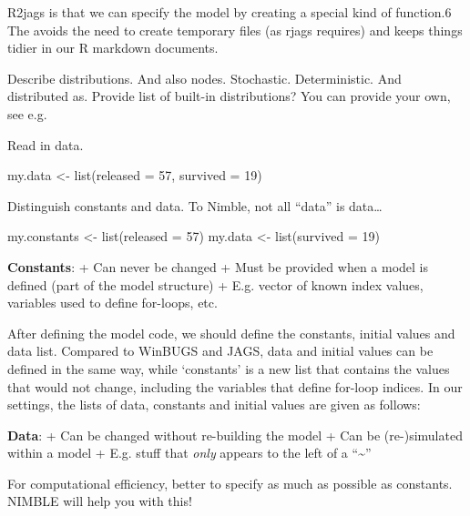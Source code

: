 \documentclass[
  12pt,
]{krantz}
\newenvironment{Shaded}{\begin{snugshade}}{\end{snugshade}}
\newcommand{\AttributeTok}[1]{\textcolor[rgb]{0.77,0.63,0.00}{#1}}
\newcommand{\DecValTok}[1]{\textcolor[rgb]{0.00,0.00,0.81}{#1}}
\newcommand{\FunctionTok}[1]{\textcolor[rgb]{0.00,0.00,0.00}{#1}}
\newcommand{\NormalTok}[1]{#1}
\newcommand{\OtherTok}[1]{\textcolor[rgb]{0.56,0.35,0.01}{#1}}
\begin{document}
R2jags is that we can specify the model by creating a special kind of function.6 The avoids the need to create temporary files (as rjags requires) and keeps things tidier in our R markdown documents.

Describe distributions. And also nodes. Stochastic. Deterministic. And distributed as. Provide list of built-in distributions? You can provide your own, see e.g.~

Read in data.

\begin{Shaded}
\begin{Highlighting}[]
\NormalTok{my.data }\OtherTok{\textless{}{-}} \FunctionTok{list}\NormalTok{(}\AttributeTok{released =} \DecValTok{57}\NormalTok{, }\AttributeTok{survived =} \DecValTok{19}\NormalTok{)}
\end{Highlighting}
\end{Shaded}

Distinguish constants and data. To Nimble, not all ``data'' is data\ldots{}

\begin{Shaded}
\begin{Highlighting}[]
\NormalTok{my.constants }\OtherTok{\textless{}{-}} \FunctionTok{list}\NormalTok{(}\AttributeTok{released =} \DecValTok{57}\NormalTok{)}
\NormalTok{my.data }\OtherTok{\textless{}{-}} \FunctionTok{list}\NormalTok{(}\AttributeTok{survived =} \DecValTok{19}\NormalTok{)}
\end{Highlighting}
\end{Shaded}

\textbf{Constants}:
+ Can never be changed
+ Must be provided when a model is defined (part of the model structure)
+ E.g. vector of known index values, variables used to define for-loops, etc.

After defining the model code, we should define the constants, initial values and data list. Compared to WinBUGS and JAGS, data and initial values can be defined in the same way, while `constants' is a new list that contains the values that would not change, including the variables that define for-loop indices. In our settings, the lists of data, constants and initial values are given as follows:

\textbf{Data}:
+ Can be changed without re-building the model
+ Can be (re-)simulated within a model
+ E.g. stuff that \emph{only} appears to the left of a ``\textasciitilde{}''

For computational efficiency, better to specify as much as possible as constants. NIMBLE will help you with this!
\end{document}
